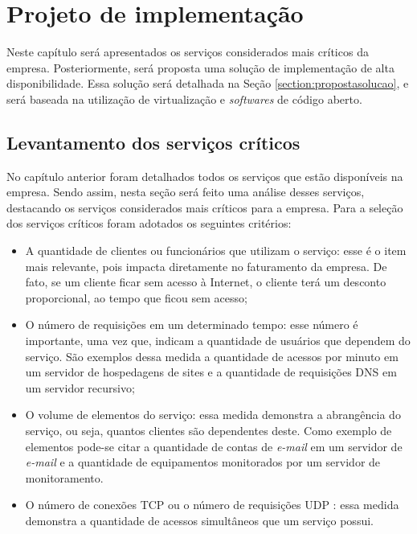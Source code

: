 \chapter{Projeto de implementação}
\label{cap:projetoimplementacao}

Neste capítulo será apresentados os serviços considerados mais críticos da empresa. Posteriormente, será proposta uma solução de implementação 
de alta disponibilidade. Essa solução será detalhada na Seção \ref{section:propostasolucao}, e será baseada na utilização de virtualização e
\textit{softwares} de código aberto. 

\section{Levantamento dos serviços críticos}
\label{section:servcrit}

No capítulo anterior foram detalhados todos os serviços que estão disponíveis na empresa. Sendo assim, nesta seção será feito uma análise desses
serviços, destacando os serviços considerados mais críticos para a empresa. Para a seleção dos serviços críticos foram adotados os seguintes
critérios:
\begin{itemize}
 \item A quantidade de clientes ou funcionários que utilizam o serviço: esse é o item mais relevante, pois impacta diretamente no faturamento
 da empresa. De fato, se um cliente ficar sem acesso à Internet, o cliente terá um desconto proporcional, ao tempo que ficou sem 
 acesso; 
 \item O número de requisições em um determinado tempo: esse número é importante, uma vez que, indicam a quantidade de usuários que dependem do 
 serviço. São exemplos dessa medida a quantidade de acessos por minuto em um servidor de hospedagens de sites e a quantidade de requisições 
 \ac{DNS} em um servidor recursivo;
 \item O volume de elementos do serviço: essa medida demonstra a abrangência do serviço, ou seja, quantos clientes são dependentes deste. 
 Como exemplo de elementos pode-se citar a quantidade de contas de \textit{e-mail} em um servidor de \textit{e-mail} e a quantidade de 
 equipamentos monitorados por um servidor de monitoramento. 
 \item O número de conexões \ac{TCP} \cite{tanenbaum2011} ou o número de requisições \ac{UDP} \cite{tanenbaum2011}: essa medida demonstra a 
 quantidade de acessos simultâneos que um serviço possui. 
\end{itemize}

